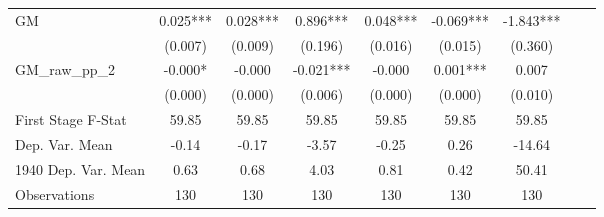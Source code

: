 \begin{tabular}{l*{8}{c}}
GM              &    0.025***&    0.028***&    0.896***&    0.048***&   -0.069***&   -1.843***\\
                &  (0.007)   &  (0.009)   &  (0.196)   &  (0.016)   &  (0.015)   &  (0.360)   \\
\addlinespace
GM\_raw\_pp\_2     &   -0.000*  &   -0.000   &   -0.021***&   -0.000   &    0.001***&    0.007   \\
                &  (0.000)   &  (0.000)   &  (0.006)   &  (0.000)   &  (0.000)   &  (0.010)   \\
\midrule
First Stage F-Stat&    59.85   &    59.85   &    59.85   &    59.85   &    59.85   &    59.85   \\
Dep. Var. Mean  &    -0.14   &    -0.17   &    -3.57   &    -0.25   &     0.26   &   -14.64   \\
1940 Dep. Var. Mean&     0.63   &     0.68   &     4.03   &     0.81   &     0.42   &    50.41   \\
Observations    &      130   &      130   &      130   &      130   &      130   &      130   \\
       \bottomrule \end{tabular}
